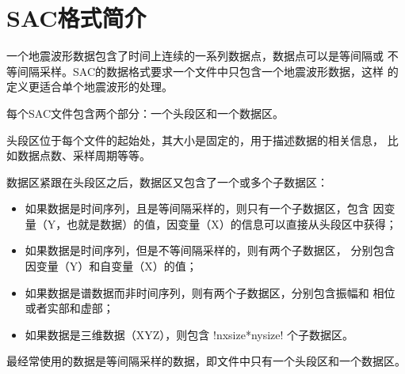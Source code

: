 \section{SAC格式简介}
一个地震波形数据包含了时间上连续的一系列数据点，数据点可以是等间隔或
不等间隔采样。SAC的数据格式要求一个文件中只包含一个地震波形数据，这样
的定义更适合单个地震波形的处理。

每个SAC文件包含两个部分：一个头段区和一个数据区。

头段区位于每个文件的起始处，其大小是固定的，用于描述数据的相关信息，
比如数据点数、采样周期等等。

数据区紧跟在头段区之后，数据区又包含了一个或多个子数据区：
\begin{itemize}
\item 如果数据是时间序列，且是等间隔采样的，则只有一个子数据区，包含
    因变量（Y，也就是数据）的值，因变量（X）的信息可以直接从头段区中获得；
\item 如果数据是时间序列，但是不等间隔采样的，则有两个子数据区，
    分别包含因变量（Y）和自变量（X）的值；
\item 如果数据是谱数据而非时间序列，则有两个子数据区，分别包含振幅和
    相位或者实部和虚部；
\item 如果数据是三维数据（XYZ），则包含 !nxsize*nysize! 个子数据区。
\end{itemize}
最经常使用的数据是等间隔采样的数据，即文件中只有一个头段区和一个数据区。
